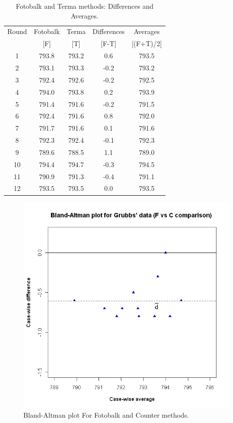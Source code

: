 \documentclass[12pt, a4paper]{report}
\theoremstyle{plain}
\theoremstyle{definition}
\theoremstyle{remark}
\begin{document}
	\begin{table}[h!]
		\renewcommand\arraystretch{0.7}%
		\begin{center}
			\begin{tabular}{|c||c|c||c|c|}
				\hline
				Round & Fotobalk  & Terma  & Differences  & Averages  \\
				&  [F] & [T] & [F-T] &  [(F+T)/2] \\
				\hline
				1 & 793.8 & 793.2 & 0.6 & 793.5 \\
				2 & 793.1 & 793.3 & -0.2 & 793.2 \\
				3 & 792.4 & 792.6 & -0.2 & 792.5 \\
				4 & 794.0 & 793.8 & 0.2 & 793.9 \\
				5 & 791.4 & 791.6 & -0.2 & 791.5 \\
				6 & 792.4& 791.6 & 0.8 & 792.0 \\
				7 & 791.7 & 791.6 & 0.1 & 791.6 \\
				8 & 792.3 & 792.4 & -0.1 & 792.3 \\
				9 & 789.6 & 788.5 & 1.1 & 789.0 \\
				10 & 794.4 & 794.7 & -0.3 & 794.5 \\
				11 & 790.9 & 791.3 & -0.4 & 791.1 \\
				12 & 793.5 & 793.5 & 0.0 & 793.5 \\
				
				\hline
			\end{tabular}
			\caption{Fotobalk and Terma methods: Differences and Averages.}
				\label{GrubbsData2}
		\end{center}
	\end{table}
	
	\newpage
	
	\begin{figure}[h!]
		\begin{center}
			\includegraphics[width=120mm]{images/GrubbsBAplot-noLOA.jpeg}
			\caption{Bland-Altman plot For Fotobalk and Counter methods.}\label{GrubbsBA-noLOA}
		\end{center}
	\end{figure}
	
\end{document}
